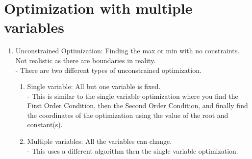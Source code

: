 \documentclass{book}
\begin{document}
    \section{Optimization with multiple variables}
    \begin{enumerate}
        \item Unconstrained Optimization: Finding the max or min with no constraints. Not realistic as there are boundaries in reality.\\
        - There are two different types of unconstrained optimization.
        \begin{enumerate}
            \item Single variable: All but one variable is fixed.\\
             - This is similar to the single variable optimization where you find the First Order Condition, then the Second Order Condition, and finally find the coordinates of the optimization using the value of the root and constant(s). 
            \item Multiple variables: All the variables can change.\\
            - This uses a different algorithm then the single variable optimization.

\end{enumerate}
\end{enumerate}
\end{document}
